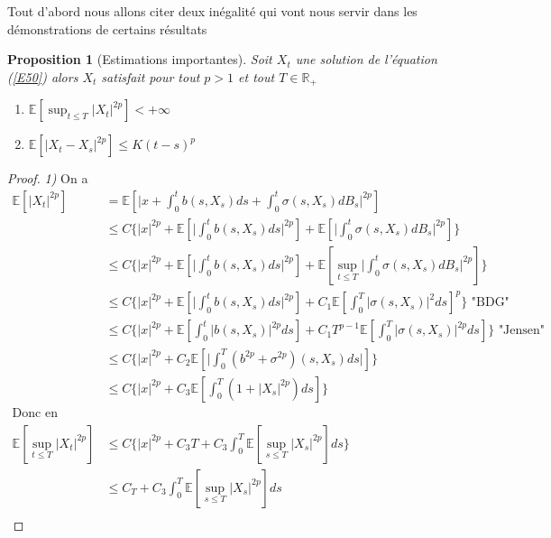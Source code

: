 \documentclass[A4paper,12pt]{report}
\newtheorem{proposition}{Proposition}[chapter]
\newcommand{\R}{{\mathbb{R}}}
\newcommand{\E}{{\mathbb{E}}}
\begin{document}
Tout d'abord nous allons citer deux inégalité qui vont nous servir dans les démonstrations de certains résultats
\begin{proposition} [Estimations importantes]\label{prop2}
Soit $X_t$ une solution de l'équation (\ref{E50}) alors $X_t$ satisfait pour tout $p>1$ et tout $T\in \R_{+}$
\begin{enumerate}
\item $\E\left[ \sup_{t\leq T} \lvert X_t \rvert^{2p} \right]<+\infty$
\item $\E\left[ \lvert X_t -X_s \rvert^{2p}\right] \leq K (t-s)^p $ 
\end{enumerate}
\end{proposition}
\begin{proof}
\textit{1)} On a \begin{align*}
\E\left[  \lvert X_t \rvert^{2p} \right] &= \E \left[ \lvert x + \int_0 ^t b(s,X_s ) ds + \int_0 ^t \sigma(s, X_s) dB_s \rvert^{2p} \right]\\
&\leq C \{\lvert x\rvert^{2p} +  \E \left[ \lvert  \int_0 ^t b(s,X_s ) ds \rvert^{2p}\right]+ \E \left[\lvert \int_0 ^t \sigma(s, X_s ) dB_s \rvert ^{2p}\right]\}\\
&\leq C \{\lvert x\rvert^{2p} +  \E \left[ \lvert  \int_0 ^t b(s,X_s) ds \rvert^{2p}\right]+ \E \left[\sup_{t\leq T}\lvert \int_0 ^t \sigma(s, X_s) dB_s \rvert ^{2p}\right]\}\\
&\leq C \{\lvert x\rvert^{2p} +  \E \left[ \lvert  \int_0 ^t b(s,X_s) ds \rvert^{2p}\right]+C_1 \E \left[ \int_0 ^T \lvert \sigma(s, X_s)\rvert^2 ds  \right]^{p}\} \text{ "BDG" }\\
&\leq C \{\lvert x\rvert^{2p} +  \E \left[   \int_0 ^t \lvert b(s,X_s) \rvert^{2p} ds \right]+C_1 T^{p-1} \E \left[ \int_0 ^T \lvert \sigma(s, X_s)\rvert^{2p} ds  \right]\} \text{ "Jensen" }\\
&\leq C \{\lvert x\rvert^{2p} +  C_2\E \left[ \lvert  \int_0 ^T (b^{2p} + \sigma^{2p}) (s,X_s) ds \rvert\right]\}\\
&\leq C \{\lvert x\rvert^{2p} +  C_3\E \left[   \int_0 ^T (1+\lvert X_s\rvert^{2p})  ds \right]\}\\
\text{Donc en passant au sup}\\
 \E\left[   \sup_{t \leq T}\lvert X_t \rvert^{2p} \right] &\leq C \{\lvert x\rvert^{2p} +  C_3T + C_3  \int_0 ^T  \E\left[   \sup_{s \leq T}\lvert X_s\rvert^{2p}\right] ds \}\\
 &\leq C_T + C_3  \int_0 ^T \E\left[   \sup_{s \leq T}\lvert X_s\rvert^{2p}\right]  ds\\

\end{align*}
\end{proof}
\end{document}
